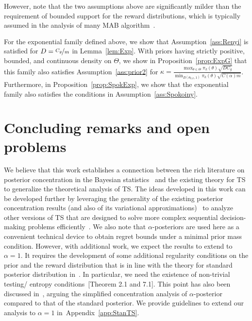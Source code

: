 \documentclass[11pt]{article}
\begin{document}
    However, note that the two assumptions above are significantly milder than the requirement of bounded support for the reward distributions, which is typically assumed in the analysis of many MAB algorithm~\citep{agrawal2012analysis,Auer2002}.
    
    For the exponential family defined above, we show that Assumption~\ref{ass:Renyi} is satisfied for $D=\nicefrac{C_g}{m}$ in Lemma~\ref{lem:Exp}. With priors having strictly positive, bounded,  and continuous density on $\Theta$, we show in Proposition~\ref{prop:ExpG} that this family also satisfies Assumption~\ref{ass:prior2} for $\kappa= \frac{\max_{\theta\in \Theta} \pi_k(\theta) \sqrt{D C_g}}{\min_{B(\theta_{0,k},1)} \pi_k(\theta) \sqrt{C(\alpha)m}}$. Furthermore, in Proposition~\ref{prop:SpokExp}, we show that the exponential family also satisfies the conditions in Assumption~\ref{ass:Spokoiny}. 
    
\section{Concluding remarks and open problems}
We believe that this work establishes a connection between the rich literature on posterior concentration in the Bayesian statistics~\citep{GGV,Kleijn2006,Ghosal_2007,bhattacharya2019bayesian,ZG,Spokoiny2012,Panov2015}
and the existing theory for TS to generalize the theoretical analysis of TS. The ideas developed in this work can be developed further by leveraging the generality of the existing posterior concentration results (and also of its variational approximations)~\citep{GGV,ZG,bhattacharya2019bayesian} to analyze other versions of TS that are designed to solve more complex sequential decision-making problems efficiently~\citep{Russo20}. 
We also note that $\alpha$-posteriors are used here as a convenient technical device to obtain regret bounds under a minimal prior mass condition.  However, with additional work, we expect the results to extend to $\alpha =1$. It requires the development of some additional regularity conditions on the prior and the reward distribution that is in line with the theory for standard posterior distribution in~\cite{GGV}. In particular, we need the existence of non-trivial testing/ entropy conditions~[Theorem 2.1 and 7.1]\citep{GGV}. This point has also been discussed in~\citet{bhattacharya2019bayesian}, arguing the simplified concentration analysis of $\alpha$-posterior compared to that of the standard posterior. We provide guidelines to extend our analysis to $\alpha=1$ in~Appendix~\ref{app:StanTS}. 
\end{document}
